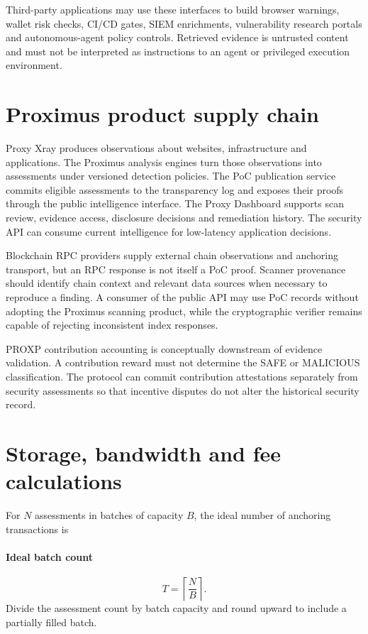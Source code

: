 \documentclass[10pt,a4paper]{article}
\begin{document}
Third-party applications may use these interfaces to build browser warnings, wallet risk checks, CI/CD gates, SIEM enrichments, vulnerability research portals and autonomous-agent policy controls. Retrieved evidence is untrusted content and must not be interpreted as instructions to an agent or privileged execution environment.


\section*{Proximus product supply chain}
Proxy Xray produces observations about websites, infrastructure and applications. The Proximus analysis engines turn those observations into assessments under versioned detection policies. The PoC publication service commits eligible assessments to the transparency log and exposes their proofs through the public intelligence interface. The Proxy Dashboard supports scan review, evidence access, disclosure decisions and remediation history. The security API can consume current intelligence for low-latency application decisions.


Blockchain RPC providers supply external chain observations and anchoring transport, but an RPC response is not itself a PoC proof. Scanner provenance should identify chain context and relevant data sources when necessary to reproduce a finding. A consumer of the public API may use PoC records without adopting the Proximus scanning product, while the cryptographic verifier remains capable of rejecting inconsistent index responses.


PROXP contribution accounting is conceptually downstream of evidence validation. A contribution reward must not determine the SAFE or MALICIOUS classification. The protocol can commit contribution attestations separately from security assessments so that incentive disputes do not alter the historical security record.


\section*{Storage, bandwidth and fee calculations}
For \(N\) assessments in batches of capacity \(B\), the ideal number of anchoring transactions is


\paragraph{Ideal batch count}
\[T=\left\lceil\frac{N}{B}\right\rceil.\]
Divide the assessment count by batch capacity and round upward to include a partially filled batch.
\end{document}
